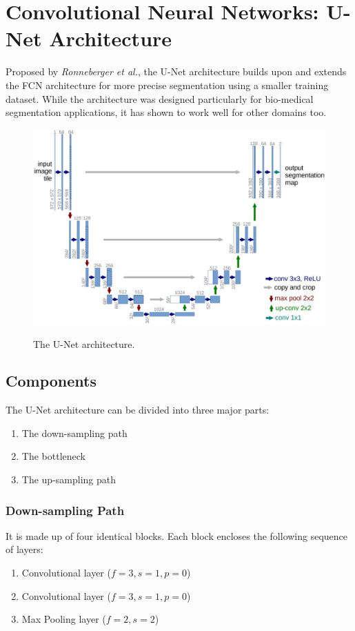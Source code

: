 \documentclass[12pt, a4paper]{report}
\begin{document}
\section{Convolutional Neural Networks: U-Net Architecture}
Proposed by \textit{Ronneberger et al.}\cite{unet}, the U-Net architecture builds upon and extends the FCN architecture for more precise segmentation using a smaller training dataset. While the architecture was designed particularly for bio-medical segmentation applications, it has shown to work well for other domains too.
\begin{figure}[h]
\centering
\includegraphics[width=\textwidth]{unet1.jpg}
\caption{The U-Net architecture.}
\cite{unet}
\end{figure}
\subsection{Components}
The U-Net architecture can be divided into three major parts:
\begin{enumerate}
	\item The down-sampling path
	\item The bottleneck
	\item The up-sampling path
\end{enumerate}
\subsubsection{Down-sampling Path}
It is made up of four identical blocks. Each block encloses the following sequence of layers:
\begin{enumerate}
	\item Convolutional layer ($f=3, s=1, p=0$)
	\item Convolutional layer ($f=3, s=1, p=0$)
	\item Max Pooling layer ($f=2, s=2$)
\end{enumerate}
\end{document}
